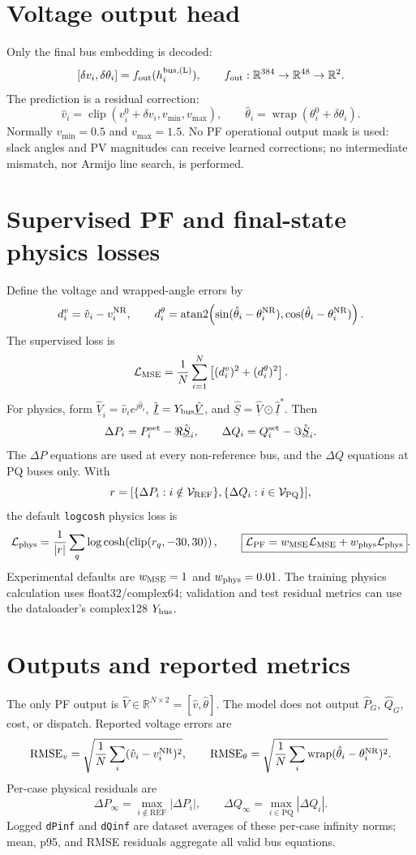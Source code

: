 \documentclass[11pt,a4paper]{article}
\newcommand{\R}{\mathbb{R}}
\newcommand{\wrap}{\operatorname{wrap}}
\newcommand{\clip}{\operatorname{clip}}
\begin{document}
\section{Voltage output head}
Only the final bus embedding is decoded:
\[
[\delta v_i,\delta\theta_i]=f_{\rm out}(h_i^{\rm bus,(L)}),\qquad f_{\rm out}:\R^{384}\to\R^{48}\to\R^2.
\]
The prediction is a residual correction:
\[
\boxed{\hat v_i=\clip(v_i^0+\delta v_i,v_{\min},v_{\max})},\qquad
\boxed{\hat\theta_i=\wrap(\theta_i^0+\delta\theta_i)}.
\]
Normally $v_{\min}=0.5$ and $v_{\max}=1.5$. No PF operational output mask is used: slack angles and PV magnitudes can receive learned corrections; no intermediate mismatch, nor Armijo line search, is performed.

\section{Supervised PF and final-state physics losses}
Define the voltage and wrapped-angle errors by
\[
d_i^v=\hat v_i-v_i^{\rm NR},\qquad d_i^\theta=\operatorname{atan2}\!\left(\sin(\hat\theta_i-\theta_i^{\rm NR}),\cos(\hat\theta_i-\theta_i^{\rm NR})\right).
\]
The supervised loss is
\[
\mathcal L_{\rm MSE}=\frac1N\sum_{i=1}^N\left[(d_i^v)^2+(d_i^\theta)^2\right].
\]
For physics, form $\hat{\underline V}_i=\hat v_i e^{j\hat\theta_i}$, $\hat{\underline I}=Y_{\rm bus}\hat{\underline V}$, and $\hat{\underline S}=\hat{\underline V}\odot\hat{\underline I}^{*}$. Then
\[
\Delta P_i=P_i^{\rm set}-\Re\hat{\underline S}_i,\qquad \Delta Q_i=Q_i^{\rm set}-\Im\hat{\underline S}_i.
\]
The $\Delta P$ equations are used at every non-reference bus, and the $\Delta Q$ equations at PQ buses only. With
\[
r=[\{\Delta P_i:i\notin\mathcal V_{\rm REF}\},\{\Delta Q_i:i\in\mathcal V_{\rm PQ}\}],
\]
the default \texttt{logcosh} physics loss is
\[
\mathcal L_{\rm phys}=\frac1{|r|}\sum_q\log\cosh\!\left(\clip(r_q,-30,30)\right),\qquad
\boxed{\mathcal L_{\rm PF}=w_{\rm MSE}\mathcal L_{\rm MSE}+w_{\rm phys}\mathcal L_{\rm phys}}.
\]
Experimental defaults are $w_{\rm MSE}=1$ and $w_{\rm phys}=0.01$. The training physics calculation uses float32/complex64; validation and test residual metrics can use the dataloader's complex128 $Y_{\rm bus}$.

\section{Outputs and reported metrics}
The only PF output is $\boxed{\hat V\in\R^{N\times2}=[\hat v,\hat\theta]}$. The model does not output $\hat P_G$, $\hat Q_G$, cost, or dispatch. Reported voltage errors are
\[
\operatorname{RMSE}_v=\sqrt{\frac1N\sum_i(\hat v_i-v_i^{\rm NR})^2},\qquad
\operatorname{RMSE}_\theta=\sqrt{\frac1N\sum_i\wrap(\hat\theta_i-\theta_i^{\rm NR})^2}.
\]
Per-case physical residuals are
\[
\Delta P_\infty=\max_{i\notin\mathrm{REF}}|\Delta P_i|,\qquad \Delta Q_\infty=\max_{i\in\mathrm{PQ}}|\Delta Q_i|.
\]
Logged \texttt{dPinf} and \texttt{dQinf} are dataset averages of these per-case infinity norms; mean, p95, and RMSE residuals aggregate all valid bus equations.
\end{document}
